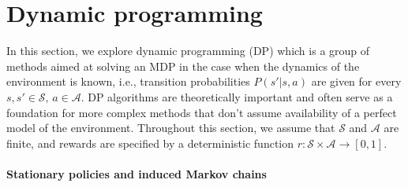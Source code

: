 \documentclass{article}
\numberwithin{equation}{section}
\newcommand{\cA}{\mathcal{A}}
\newcommand{\cS}{\mathcal{S}}
\begin{document}
\section{Dynamic programming}\label{s3}
In this section, we  explore dynamic programming (DP) which is a group of methods aimed at solving an MDP in the case when the dynamics of the environment is known, i.e., transition probabilities $P(s'|s,a)$ are given for every $s,s'\in\cS,\, a\in\cA$. DP algorithms are theoretically important and often serve as a foundation for more complex methods that don't assume availability of a perfect model of the environment. Throughout this section, we assume that \(\cS\) and \(\cA\) are finite, and rewards are specified by a deterministic function \(r : \cS\times\cA\to [0,1]\).

\paragraph{Stationary policies and induced Markov chains}  
\end{document}
